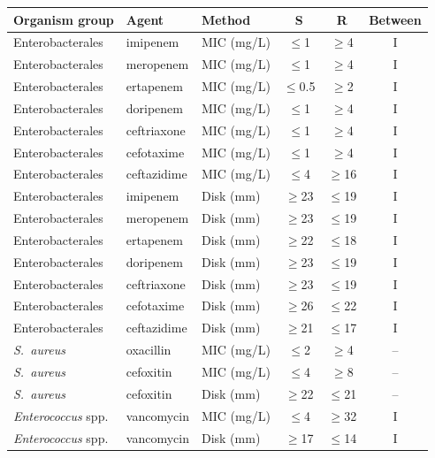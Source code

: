 \begin{tabular}{lllccc}
\hline\hline
Organism group & Agent & Method & S & R & Between \\
\hline
Enterobacterales & imipenem & MIC (mg/L) & $\le$1 & $\ge$4 & I \\
Enterobacterales & meropenem & MIC (mg/L) & $\le$1 & $\ge$4 & I \\
Enterobacterales & ertapenem & MIC (mg/L) & $\le$0.5 & $\ge$2 & I \\
Enterobacterales & doripenem & MIC (mg/L) & $\le$1 & $\ge$4 & I \\
Enterobacterales & ceftriaxone & MIC (mg/L) & $\le$1 & $\ge$4 & I \\
Enterobacterales & cefotaxime & MIC (mg/L) & $\le$1 & $\ge$4 & I \\
Enterobacterales & ceftazidime & MIC (mg/L) & $\le$4 & $\ge$16 & I \\
Enterobacterales & imipenem & Disk (mm) & $\ge$23 & $\le$19 & I \\
Enterobacterales & meropenem & Disk (mm) & $\ge$23 & $\le$19 & I \\
Enterobacterales & ertapenem & Disk (mm) & $\ge$22 & $\le$18 & I \\
Enterobacterales & doripenem & Disk (mm) & $\ge$23 & $\le$19 & I \\
Enterobacterales & ceftriaxone & Disk (mm) & $\ge$23 & $\le$19 & I \\
Enterobacterales & cefotaxime & Disk (mm) & $\ge$26 & $\le$22 & I \\
Enterobacterales & ceftazidime & Disk (mm) & $\ge$21 & $\le$17 & I \\
\textit{S.~aureus} & oxacillin & MIC (mg/L) & $\le$2 & $\ge$4 & -- \\
\textit{S.~aureus} & cefoxitin & MIC (mg/L) & $\le$4 & $\ge$8 & -- \\
\textit{S.~aureus} & cefoxitin & Disk (mm) & $\ge$22 & $\le$21 & -- \\
\textit{Enterococcus} spp. & vancomycin & MIC (mg/L) & $\le$4 & $\ge$32 & I \\
\textit{Enterococcus} spp. & vancomycin & Disk (mm) & $\ge$17 & $\le$14 & I \\
\hline\hline
\end{tabular}
